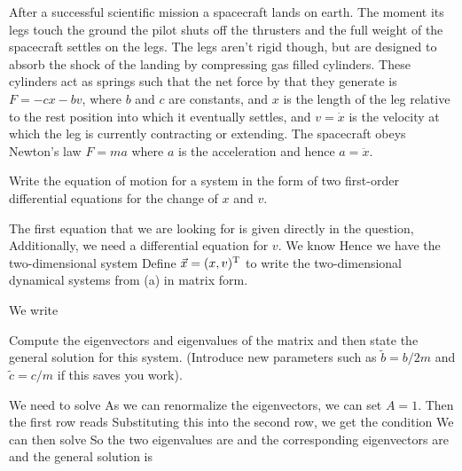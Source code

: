 
After a successful scientific mission a spacecraft lands on earth. The moment its legs touch the ground the pilot shuts off the thrusters
and the full weight of the spacecraft settles on the legs. The legs aren't rigid though, but are designed to absorb the shock of the landing by compressing gas filled cylinders. These cylinders act as springs such that the net force by that they generate is $F=-cx-bv$, where $b$ and $c$ are  constants, and $x$ is the length of the leg relative to the rest position into which it eventually settles, and $v=\dot{x}$ is the velocity at which the leg is currently contracting or extending. The spacecraft obeys Newton's law $F=ma$ where $a$ is the acceleration and hence $a=\ddot{x}$. 

\subquestion
Write the equation of motion for a system in the form of two first-order differential equations for the change of $x$ and $v$. 

\solution 
The first equation that we are looking for is given directly in the question,
Additionally, we need a differential equation for $v$. We know
Hence we have the two-dimensional system 
\subquestion 
Define $\vec{x}=(x,v)^{\rm T}$ to write the two-dimensional dynamical systems from (a) in matrix form.

\solution
We write 

\subquestion 
Compute the eigenvectors and eigenvalues of the matrix and then state the general solution for this system. (Introduce new parameters such as $\tilde{b}=b/2m$ and $\tilde{c}=c/m$ if this saves you work).

\solution 
We need to solve 
As we can renormalize the eigenvectors, we can set $A=1$. Then the first row reads 
Substituting this into the second row, we get the condition 
We can then solve 
So the two eigenvalues are 
and the corresponding eigenvectors are 
and the general solution is 

